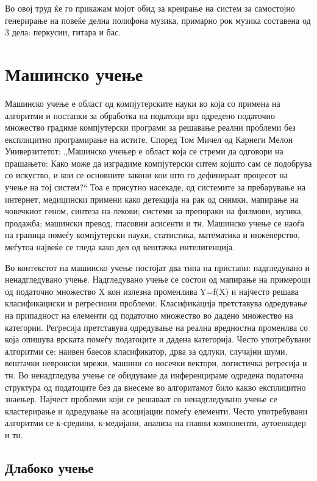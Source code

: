 Во овој труд ќе го прикажам мојот обид за креирање на систем за самостојно генерирање на повеќе делна полифона музика, примарно рок музика составена од 3 дела: перкусии, гитара и бас.

\chapter{Машинско учење}

Машинско учење е област од компјутерските науки во која со примена на алгоритми и постапки за обработка на податоци врз одредено податочно множество градиме компјутерски програми за решавање реални проблеми без експлицитно програмирање на истите. Според Том Мичел од Карнеги Мелон Универзитетот: „Машинско учењер е област која се стреми да одговори на прашањето: Како може да изградиме компјутерски ситем којшто сам се подобрува со искуство, и кои се основните закони кои што го дефинираат процесот на учење на тој систем?“ Тоа е присутно насекаде, од системите за пребарување на интернет, медицински примени како детекција на рак од снимки, мапирање на човечкиот геном, синтеза на лекови; системи за препораки на филмови, музика, продажба; машински превод, гласовни асисенти и тн. Машинско учење се наоѓа на граница помеѓу компјутерски науки, статистика, математика и инженерство, меѓутоа највеќе се гледа како дел од вештачка интелигенција.

Во контекстот на машинско учење постојат два типа на пристапи: надгледувано и ненадгледувано учење. Надгледувано учење се состои од мапирање на примероци од податочно множество X кон излезна променлива Y=f(X) и најчесто решава класификациски и регресиони проблеми. Класификација претставува одредување на припадност на елементи од податочно множество во дадено множество на категории. Регресија претставува одредување на реална вредностна променлва со која опишува врската помеѓу податоците и дадена категорија. Често употребувани алгоритми се: наивен баесов класификатор, дрва за одлуки, случајни шуми, вештачки невронски мрежи, машини со носечки вектори, логистичка регресија и тн. 
Во ненадгледува учење се обидуваме да инференцираме одредена податочна структура од податоците без да внесеме во алгоритамот било какво експлицитно знаењер. Најчест проблеми који се решаваат со ненадгледувано учење се кластерирање и одредување на асоцијации помеѓу елементи. Често употребувани алгоритми се к-средини, к-медијани, анализа на главни компоненти, аутоенкодер и тн.

\section{Длабоко учење}

